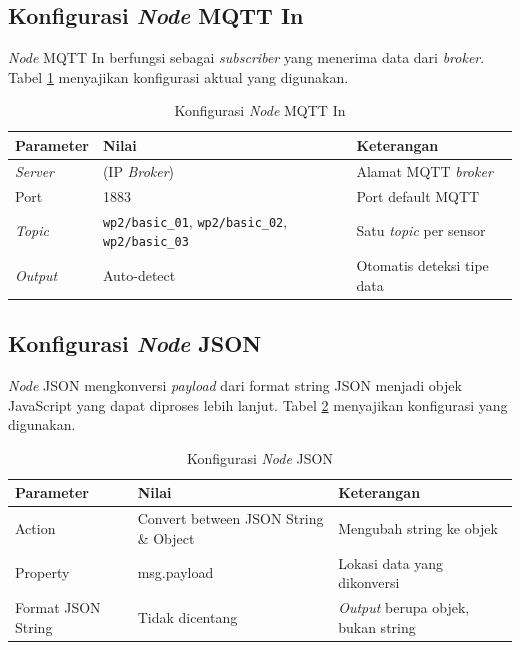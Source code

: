 \subsection{Konfigurasi \textit{Node} MQTT In}

\textit{Node} MQTT In berfungsi sebagai \textit{subscriber} yang menerima data dari \textit{broker}. Tabel \ref{tab:konfigurasi-mqtt-node} menyajikan konfigurasi aktual yang digunakan.

\begin{table}[H]
  \caption{Konfigurasi \textit{Node} MQTT In}
  \label{tab:konfigurasi-mqtt-node}
  \begin{tabularx}{\textwidth}{| l | l | X |}
    \hline
    \textbf{Parameter} & \textbf{Nilai} & \textbf{Keterangan} \\
    \hline
    \textit{Server} & (IP \textit{Broker}) & Alamat MQTT \textit{broker} \\
    \hline
    Port & 1883 & Port default MQTT \\
    \hline
    \textit{Topic} & \texttt{wp2/basic\_01}, \texttt{wp2/basic\_02}, \texttt{wp2/basic\_03} & Satu \textit{topic} per sensor \\
    \hline
    \textit{Output} & Auto-detect & Otomatis deteksi tipe data \\
    \hline
  \end{tabularx}
\end{table}

\subsection{Konfigurasi \textit{Node} JSON}

\textit{Node} JSON mengkonversi \textit{payload} dari format string JSON menjadi objek JavaScript yang dapat diproses lebih lanjut. Tabel \ref{tab:impl-konfigurasi-json} menyajikan konfigurasi yang digunakan.

\begin{table}[H]
  \caption{Konfigurasi \textit{Node} JSON}
  \label{tab:impl-konfigurasi-json}
  \begin{tabularx}{\textwidth}{| l | l | X |}
    \hline
    \textbf{Parameter} & \textbf{Nilai} & \textbf{Keterangan} \\
    \hline
    Action & Convert between JSON String \& Object & Mengubah string ke objek \\
    \hline
    Property & msg.payload & Lokasi data yang dikonversi \\
    \hline
    Format JSON String & Tidak dicentang & \textit{Output} berupa objek, bukan string \\
    \hline
  \end{tabularx}
\end{table}

